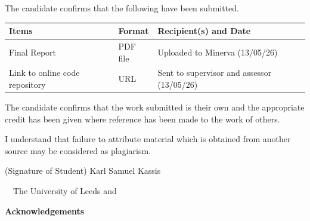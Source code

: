 \frontcover

\clearpage

\noindent The candidate confirms that the following have been submitted.\\


\begin{table}[ht!]
\begin{tabular}{|p{}|p{}|p{}|}
\hline 
Items & Format & Recipient(s) and Date \\ 
\hline 
Final Report & PDF file & Uploaded to Minerva (13/05/26) \\ 
\hline 
Link to online code repository & URL & Sent to supervisor and assessor (13/05/26) \\ 
\hline
\end{tabular} 
\end{table}


\vfill

\noindent The candidate confirms that the work submitted is their own and the appropriate credit has been given where reference has been made to the work of others.

\vfill

\noindent I understand that failure to attribute material which is obtained from another source may be considered as plagiarism.

\vfill

\flushright(Signature of Student) Karl Samuel Kassis
\flushleft

\vfill

\textcopyright~\session~The University of Leeds and~\fullname

\begin{dissertationsummary}

\end{dissertationsummary}

\clearpage
\centering\textbf{Acknowledgements}
\flushleft


\tableofcontents

\clearpage

